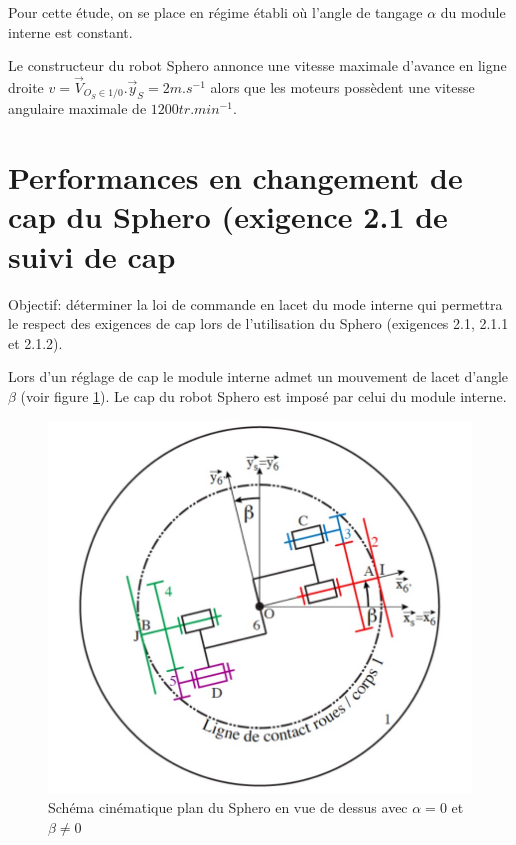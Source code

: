 
Pour cette étude, on se place en régime établi où l’angle de tangage $\alpha$ du module interne est constant. 



Le constructeur du robot Sphero annonce une vitesse maximale d’avance en ligne droite $v=\vec{V}_{O_S\in1/0}.\vec{y}_S= 2 m.s^{-1}$ alors que les moteurs possèdent une vitesse angulaire maximale de $1200 tr.min^{-1}$.


\section{Performances en changement de cap du Sphero (exigence 2.1 de suivi de cap}

Objectif: déterminer la loi de commande en lacet du mode interne qui permettra le respect des exigences de cap lors de l’utilisation du Sphero (exigences 2.1, 2.1.1 et 2.1.2).

Lors d’un réglage de cap le module interne admet un mouvement de lacet d’angle $\beta$ (voir figure \ref{fig14}). Le cap du robot Sphero est imposé par celui du module interne. 

\begin{figure}[!ht]\begin{center}
 \includegraphics[width=0.55\linewidth]{img/figure_14}
 \caption{ Schéma cinématique plan du Sphero en vue de dessus avec $\alpha=0$ et $\beta\neq0$}
 \label{fig14}
\end{center}\end{figure}

